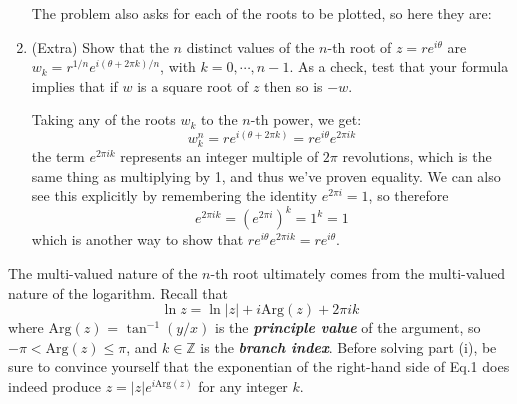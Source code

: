 \documentclass[10pt]{article}
\newcommand{\Arg}{\mathrm{Arg}}
\begin{document}
\begin{enumerate}[label=\alph*),resume]
\begin{solution}
				The problem also asks for each of the roots to be plotted, so here they are:

				\begin{center}
				\end{center}
			\end{solution}
		\item (Extra) Show that the $n$ distinct values of the $n$-th root of $z = re^{i \theta}$ are $w_k = 
			r^{1/n}e^{i(\theta + 2\pi k)/n}$, with $k = 0, \cdots, n - 1$. As a check, test that your formula 
			implies that if $w$ is a square root of $z$ then so is $-w$.

			\begin{solution}
				Taking any of the roots $w_k$ to the $n$-th power, we get:
				\[
					w_k^n = re^{i(\theta + 2\pi k)} = re^{i \theta} e^{2 \pi i k} 	
				\] 
				the term $e^{2 \pi i k}$ represents an integer multiple of $2\pi$ revolutions, which is 
				the same thing as multiplying by 1, and thus we've proven equality. We can also see this 
				explicitly by remembering the identity $e^{2 \pi i} = 1$, so therefore 
				\[
					e^{2 \pi i k} = (e^{2 \pi i})^k = 1^k = 1
				\] 
				which is another way to show that $re^{i \theta} e^{2 \pi i k} = re^{i \theta}$.
			\end{solution}
	 \end{enumerate}
	 The multi-valued nature of the $n$-th root ultimately comes from the multi-valued nature of the logarithm. 
	 Recall that 
	 \[
	  \ln z = \ln|z| + i \Arg(z) + 2 \pi ik
	 \] 
	 where $\Arg(z)$ = $\tan^{-1}(y/x)$ is the \textbf{\textit{principle value}} of the argument, so $-\pi < 
	 \Arg(z) \le \pi$, and $k \in \mathbb Z$ is the \textbf{\textit{branch index}}. Before solving part (i), be
	 sure to convince yourself that the exponentian of the right-hand side of Eq.1 does indeed produce $z = |z|
	 e^{i \Arg(z)}$ for any integer $k$. 
\end{document}
